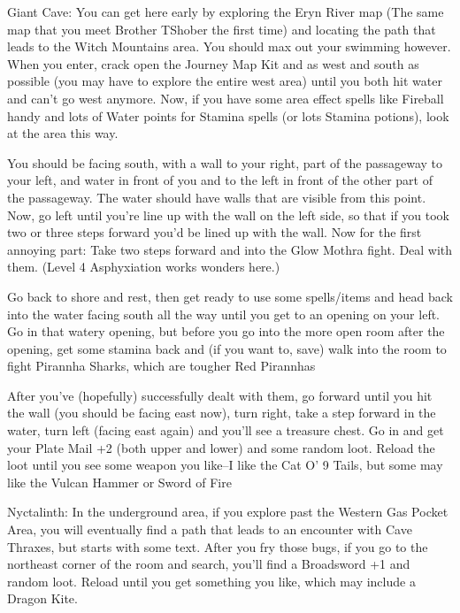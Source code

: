 \documentclass[12pt]{article}
\begin{document}
Giant Cave: You can get here early by exploring the Eryn River map (The
same map that you meet Brother TShober the first time) and locating the
path that leads to the Witch Mountains area. You should max out your
swimming however. When you enter, crack open the Journey Map Kit and as
west and south as possible (you may have to explore the entire west
area) until you both hit water and can't go west anymore. Now, if you
have some area effect spells like Fireball handy and lots of Water
points for Stamina spells (or lots Stamina potions), look at the area
this way.

         You should be facing south, with a wall to your right, part of the
         passageway to your left, and water in front of you and to the left
         in front of the other part of the passageway.  The water should
         have walls that are visible from this point.  Now, go left until
         you're line up with the wall on the left side, so that if you took
         two or three steps forward you'd be lined up with the wall.  Now
         for the first annoying part:  Take two steps forward and into
         the Glow Mothra fight.  Deal with them.  (Level 4 Asphyxiation
         works wonders here.)

         Go back to shore and rest, then get ready to use some spells/items
         and head back into the water facing south all the way until you get
         to an opening on your left.  Go in that watery opening, but before
         you go into the more open room after the opening, get some stamina
         back and (if you want to, save) walk into the room to fight
         Pirannha Sharks, which are tougher Red Pirannhas

         After you've (hopefully) successfully dealt with them, go forward
         until you hit the wall (you should be facing east now), turn right,
         take a step forward in the water, turn left (facing east again)
         and you'll see a treasure chest.  Go in and get your Plate Mail +2
         (both upper and lower) and some random loot.  Reload the loot until
         you see some weapon you like--I like the Cat O' 9 Tails, but some
         may like the Vulcan Hammer or Sword of Fire

Nyctalinth: In the underground area, if you explore past the Western Gas
Pocket Area, you will eventually find a path that leads to an encounter
with Cave Thraxes, but starts with some text. After you fry those bugs,
if you go to the northeast corner of the room and search, you'll find a
Broadsword +1 and random loot. Reload until you get something you like,
which may include a Dragon Kite.
\end{document}
